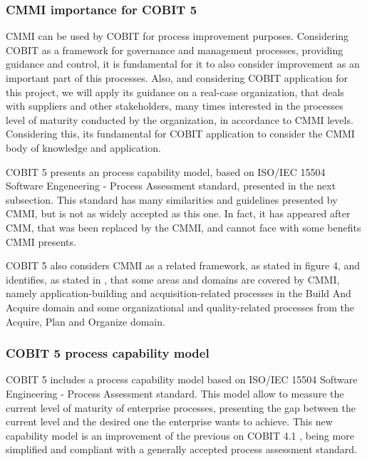 \subsubsection{CMMI importance for COBIT 5}

CMMI can be used by COBIT for process improvement purposes. Considering COBIT as a framework for governance and management processes, providing guidance and control, it is fundamental for it to also consider improvement as an important part of this processes. Also, and considering COBIT application for this project, we will apply its guidance on a real-case organization, that deals with suppliers and other stakeholders, many times interested in the processes level of maturity conducted by the organization, in accordance to CMMI levels. Considering this, its fundamental for COBIT application to consider the CMMI body of knowledge and application.\par
COBIT 5 presents an process capability model, based on ISO/IEC 15504 Software Engeneering - Process Assessment standard, presented in the next subsection. This standard has many similarities and guidelines presented by CMMI, but is not as widely accepted as this one. In fact, it has appeared after CMM, that was been replaced by the CMMI, and cannot face with some benefits CMMI presents.\par
COBIT 5 also considers CMMI as a related framework, as stated in figure 4, and identifies, as stated in \cite{2012cobit}, that some areas and domains are covered by CMMI, namely application-building and acquisition-related processes in the Build And Acquire domain and some organizational and quality-related processes from the Acquire, Plan and Organize domain.\par


\subsubsection{COBIT 5 process capability model}

COBIT 5 includes a process capability model based on ISO/IEC 15504 Software Engineering - Process Assessment standard.\cite{ISO15504} This model allow to measure the current level of maturity of enterprise processes, presenting the gap between the current level and the desired one the enterprise wants to achieve. This new capability model is an improvement of the previous on COBIT 4.1 \cite{cobit4}, being more simplified and compliant with a generally accepted process assessment standard.\par


